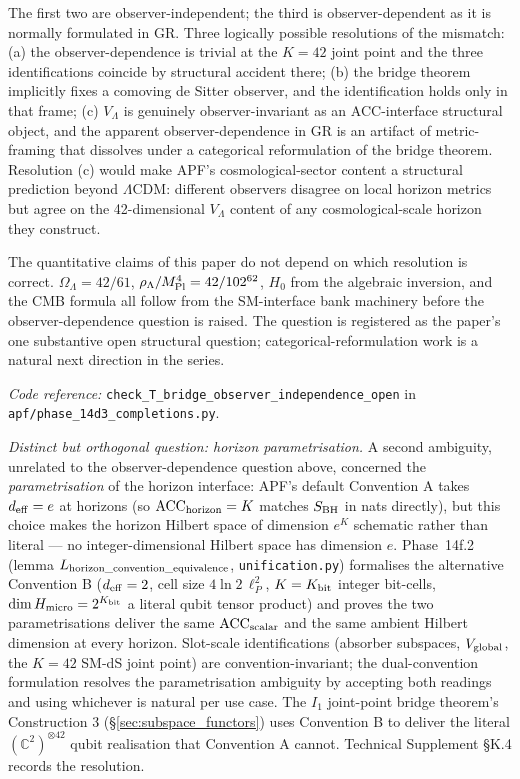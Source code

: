 \documentclass[11pt]{article}
\newcommand{\coderef}[2]{\smallskip\noindent\textit{Code reference:} \texttt{#1} in \texttt{#2}.}
\newcommand{\Mpl}{M_{\rm Pl}}
\begin{document}
The first two are observer-independent; the third is observer-dependent as it is normally formulated in GR. Three logically possible resolutions of the mismatch: (a) the observer-dependence is trivial at the $K = 42$ joint point and the three identifications coincide by structural accident there; (b) the bridge theorem implicitly fixes a comoving de Sitter observer, and the identification holds only in that frame; (c) $V_\Lambda$ is genuinely observer-invariant as an ACC-interface structural object, and the apparent observer-dependence in GR is an artifact of metric-framing that dissolves under a categorical reformulation of the bridge theorem. Resolution (c) would make APF's cosmological-sector content a structural prediction beyond $\Lambda$CDM: different observers disagree on local horizon metrics but agree on the 42-dimensional $V_\Lambda$ content of any cosmological-scale horizon they construct.

The quantitative claims of this paper do not depend on which resolution is correct. $\Omega_\Lambda = 42/61$, $\rho_\Lambda/\Mpl^4 = 42/102^{62}$, $H_0$ from the algebraic inversion, and the CMB formula all follow from the SM-interface bank machinery before the observer-dependence question is raised. The question is registered as the paper's one substantive open structural question; categorical-reformulation work is a natural next direction in the series.

\coderef{check\_T\_bridge\_observer\_independence\_open}{apf/phase\_14d3\_completions.py}

\smallskip

\noindent\textit{Distinct but orthogonal question: horizon parametrisation.}  A second ambiguity, unrelated to the observer-dependence question above, concerned the \emph{parametrisation} of the horizon interface: APF's default Convention A takes $d_{\rm eff} = e$ at horizons (so $\mathrm{ACC}_{\rm horizon} = K$ matches $S_{\rm BH}$ in nats directly), but this choice makes the horizon Hilbert space of dimension $e^K$ schematic rather than literal --- no integer-dimensional Hilbert space has dimension $e$.  Phase~14f.2 (lemma $L_{\rm horizon\_convention\_equivalence}$, \texttt{unification.py}) formalises the alternative Convention B ($d_{\rm eff} = 2$, cell size $4 \ln 2 \, \ell_P^2$, $K = K_{\rm bit}$ integer bit-cells, $\dim H_{\rm micro} = 2^{K_{\rm bit}}$ a literal qubit tensor product) and proves the two parametrisations deliver the same $\mathrm{ACC}_{\rm scalar}$ and the same ambient Hilbert dimension at every horizon.  Slot-scale identifications (absorber subspaces, $V_{\rm global}$, the $K = 42$ SM-dS joint point) are convention-invariant; the dual-convention formulation resolves the parametrisation ambiguity by accepting both readings and using whichever is natural per use case.  The $I_1$ joint-point bridge theorem's Construction 3 (\S\ref{sec:subspace_functors}) uses Convention B to deliver the literal $(\mathbb{C}^2)^{\otimes 42}$ qubit realisation that Convention A cannot.  Technical Supplement \S K.4 records the resolution.
\end{document}
